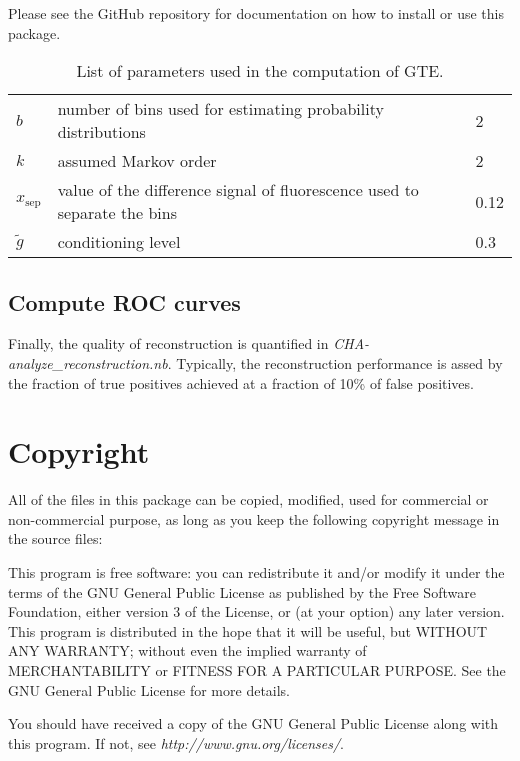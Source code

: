 \documentclass[a4paper,11pt]{article}
\begin{document}
Please see the GitHub repository for documentation on how to install or use this package.

\begin{table}[ht]
  \begin{center}
    \begin{tabular}
      {|ll|l|} %
      \hline
      $b$ & number of bins used for estimating probability distributions & 2 \\
      $k$ & assumed Markov order & 2 \\
      $x_{\text{sep}}$ & value of the difference signal of fluorescence used to separate the bins & 0.12 \\
      $\tilde{g}$ & conditioning level & 0.3 \\
      \hline
    \end{tabular}
  \end{center}
  \caption{List of parameters used in the computation of GTE.}
  \label{tab:parameters_rec}
\end{table}


\subsection{Compute ROC curves}

Finally, the quality of reconstruction is quantified in \emph{CHA-analyze\_reconstruction.nb}.
Typically, the reconstruction performance is assed by the fraction of true positives achieved at a fraction of 10\% of false positives.



\section{Copyright}

All of the files in this package can be copied, modified, used for commercial or non-commercial purpose, as long as you keep the following copyright message in the source files:

This program is free software: you can redistribute it and/or modify it under the terms of the GNU General Public License as published by the Free Software Foundation, either version 3 of the License, or (at your option) any later version.
This program is distributed in the hope that it will be useful, but WITHOUT ANY WARRANTY; without even the implied warranty of MERCHANTABILITY or FITNESS FOR A PARTICULAR PURPOSE.  See the GNU General Public License for more details.

You should have received a copy of the GNU General Public License along with this program.  If not, see \emph{http://www.gnu.org/licenses/}.




\end{document}
